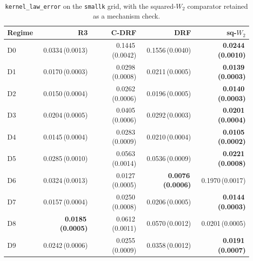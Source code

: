 \begin{table}[htbp]
\centering
\caption{\texttt{kernel\_law\_error} on the \texttt{smallk} grid, with the squared-$W_2$ comparator retained as a mechanism check.}
\label{tab:smallk-kernel}
\scriptsize
\setlength{\tabcolsep}{3.2pt}
\begin{tabular}{@{}lrrrr@{}}
\toprule
Regime & R3 & C-DRF & DRF & sq-$W_2$ \\
\midrule
D0 & 0.0334\,(0.0013) & 0.1445\,(0.0042) & 0.1556\,(0.0040) & \textbf{0.0244\,(0.0010)} \\
D1 & 0.0170\,(0.0003) & 0.0298\,(0.0008) & 0.0211\,(0.0005) & \textbf{0.0139\,(0.0003)} \\
D2 & 0.0150\,(0.0004) & 0.0262\,(0.0006) & 0.0196\,(0.0005) & \textbf{0.0140\,(0.0003)} \\
D3 & 0.0204\,(0.0005) & 0.0405\,(0.0006) & 0.0292\,(0.0003) & \textbf{0.0201\,(0.0004)} \\
D4 & 0.0145\,(0.0004) & 0.0283\,(0.0009) & 0.0210\,(0.0004) & \textbf{0.0105\,(0.0002)} \\
D5 & 0.0285\,(0.0010) & 0.0563\,(0.0014) & 0.0536\,(0.0009) & \textbf{0.0221\,(0.0008)} \\
D6 & 0.0324\,(0.0013) & 0.0127\,(0.0005) & \textbf{0.0076\,(0.0006)} & 0.1970\,(0.0017) \\
D7 & 0.0157\,(0.0004) & 0.0250\,(0.0008) & 0.0206\,(0.0005) & \textbf{0.0144\,(0.0003)} \\
D8 & \textbf{0.0185\,(0.0005)} & 0.0612\,(0.0011) & 0.0570\,(0.0012) & 0.0201\,(0.0005) \\
D9 & 0.0242\,(0.0006) & 0.0255\,(0.0009) & 0.0358\,(0.0012) & \textbf{0.0191\,(0.0007)} \\
\bottomrule
\end{tabular}
\end{table}

